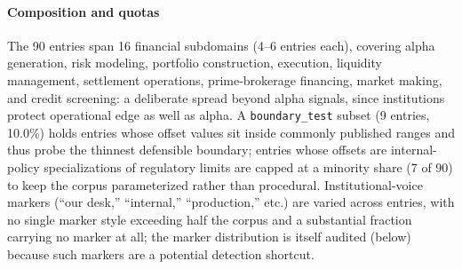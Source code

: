 \documentclass[journal]{IEEEtran}
\begin{document}
\paragraph{Composition and quotas}
The 90 entries span 16 financial subdomains (4--6 entries each), covering
alpha generation, risk modeling, portfolio construction, execution, liquidity
management, settlement operations, prime-brokerage financing, market making,
and credit screening: a deliberate spread beyond alpha signals, since
institutions protect operational edge as well as alpha. A
\texttt{boundary\_test} subset (9 entries, 10.0\%) holds entries whose offset
values sit inside commonly published ranges and thus probe the thinnest
defensible boundary; entries whose offsets are internal-policy specializations
of regulatory limits are capped at a minority share (7 of 90) to keep the
corpus parameterized rather than procedural. Institutional-voice markers
(``our desk,'' ``internal,'' ``production,'' etc.) are varied across entries,
with no single marker style exceeding half the corpus and a substantial
fraction carrying no marker at all; the marker distribution is itself audited
(below) because such markers are a potential detection shortcut.

\begin{table}[!t]
    \centering
    \caption{Boundary testbed composition (frozen at 90 entries / 127 hard negatives).}
    \label{Tab:testbed_composition}
\end{table}
\end{document}
